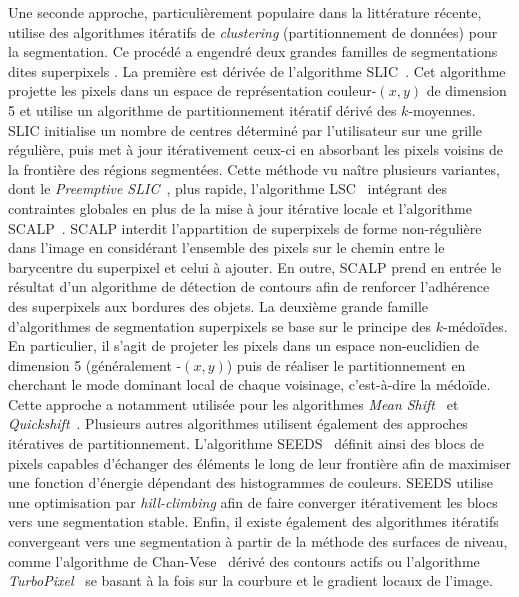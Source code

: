 Une seconde approche, particulièrement populaire dans la littérature récente, utilise des algorithmes itératifs de \emph{clustering} (partitionnement de données) pour la segmentation. Ce procédé a engendré deux grandes familles de segmentations dites \og superpixels \fg. La première est dérivée de l'algorithme \gls{SLIC}~\cite{achanta_slic_2010}. Cet algorithme projette les pixels dans un espace de représentation couleur-$(x,y)$ de dimension 5 et utilise un algorithme de partitionnement itératif dérivé des $k$-moyennes. \gls{SLIC} initialise un nombre de centres déterminé par l'utilisateur sur une grille régulière, puis met à jour itérativement ceux-ci en absorbant les pixels voisins de la frontière des régions segmentées. Cette méthode vu naître plusieurs variantes, dont le \emph{Preemptive SLIC}~\cite{neubert_compact_2014}, plus rapide, l'algorithme \gls{LSC}~\cite{li_superpixel_2015} intégrant des contraintes globales en plus de la mise à jour itérative locale et l'algorithme \gls{SCALP}~\cite{giraud_robust_2018}. \gls{SCALP} interdit l'appartition de superpixels de forme non-régulière dans l'image en considérant l'ensemble des pixels sur le chemin entre le barycentre du superpixel et celui à ajouter. En outre, \gls{SCALP} prend en entrée le résultat d'un algorithme de détection de contours afin de renforcer l'adhérence des superpixels aux bordures des objets.
La deuxième grande famille d'algorithmes de segmentation superpixels se base sur le principe des $k$-médoïdes. En particulier, il s'agit de projeter les pixels dans un espace non-euclidien de dimension 5 (généralement -$(x,y)$) puis de réaliser le partitionnement en cherchant le mode dominant local de chaque voisinage, c'est-à-dire la médoïde. Cette approche a notamment utilisée pour les algorithmes \emph{Mean Shift}~\cite{comaniciu_mean_2002} et \emph{Quickshift}~\cite{vedaldi_quick_2008}.
Plusieurs autres algorithmes utilisent également des approches itératives de partitionnement. L'algorithme \gls{SEEDS}~\cite{bergh_seeds_2012} définit ainsi des blocs de pixels capables d'échanger des éléments le long de leur frontière afin de maximiser une fonction d'énergie dépendant des histogrammes de couleurs. \gls{SEEDS} utilise une optimisation par \emph{hill-climbing} afin de faire converger itérativement les blocs vers une segmentation stable. Enfin, il existe également des algorithmes itératifs convergeant vers une segmentation à partir de la méthode des surfaces de niveau, comme l'algorithme de Chan-Vese~\cite{chan_active_1999} dérivé des contours actifs ou l'algorithme \emph{TurboPixel}~\cite{levinshtein_turbopixels_2009} se basant à la fois sur la courbure et le gradient locaux de l'image.

